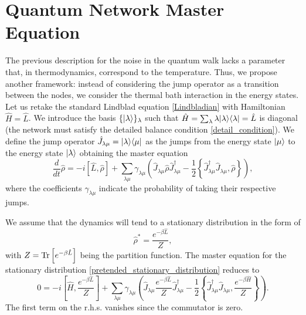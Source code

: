 \section{Quantum Network Master Equation}

The previous description for the noise in the quantum walk lacks a parameter that, in thermodynamics, correspond to the temperature. 
Thus, we propose another framework: instead of considering the jump operator as a transition between the nodes, we consider the thermal bath interaction in the energy states.
Let us retake the standard Lindblad equation \eqref{Lindbladian} with Hamiltonian $\hat H = \hat L$.
We introduce the basis $\{\lvert\lambda\rangle\}_{\lambda}$ such that $\hat H = \sum_\lambda \lambda\lvert\lambda\rangle\langle\lambda\rvert = \hat L$ is diagonal (the network must satisfy the detailed balance condition \eqref{detail_condition}).
We define the jump operator $\hat J_{\lambda\mu} = \lvert\lambda\rangle\langle\mu\rvert$ as the jumps from the energy state $\lvert\mu\rangle$ to the energy state $\lvert\lambda\rangle$ obtaining the master equation
\begin{equation}\label{Lindblad_energy_jump}
    \frac{d}{dt}\hat\rho = -i\left[\hat L,\hat\rho\right] + \sum_{\lambda\mu} \gamma_{\lambda\mu} \left(\hat J_{\lambda\mu} \hat\rho \hat J^\dagger_{\lambda\mu} - \frac{1}{2}\left\{ \hat J^\dagger_{\lambda\mu}\hat J_{\lambda\mu}, \hat\rho\right\} \right),
\end{equation}
where the coefficients $\gamma_{\lambda\mu}$ indicate the probability of taking their respective jumps.

We assume that the dynamics will tend to a stationary distribution in the form of
\begin{equation}\label{pretended_stationary_distribution}
    \hat \rho^* = \frac{e^{-\beta\hat L}}{Z},
\end{equation}
with $Z = \operatorname{Tr}\left[e^{-\beta\hat L}\right]$ being the partition function.
The master equation for the stationary distribution \eqref{pretended_stationary_distribution} reduces to
\begin{equation}\label{cancel_master_equation}
    0 = -i\left[\hat H, \frac{e^{-\beta\hat L}}{Z}\right] + \sum_{\lambda\mu} \gamma_{\lambda\mu} \left(\hat J_{\lambda\mu}  \frac{e^{-\beta\hat L}}{Z} \hat J^\dagger_{\lambda\mu} - \frac{1}{2}\left\{ \hat J^\dagger_{\lambda\mu}\hat J_{\lambda\mu},  \frac{e^{-\beta\hat H}}{Z}\right\} \right).
\end{equation}
The first term on the r.h.s. vanishes since the commutator is zero.

